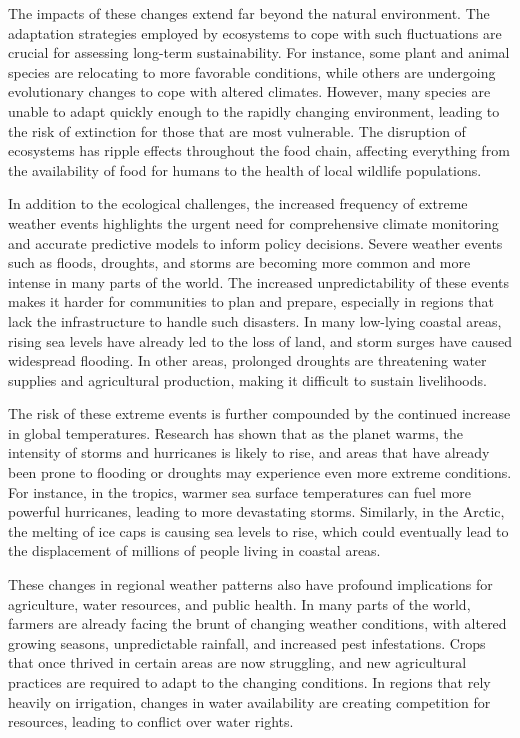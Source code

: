 The impacts of these changes extend far beyond the natural environment. The adaptation strategies employed by ecosystems to cope with such fluctuations are crucial for assessing long-term sustainability. For instance, some plant and animal species are relocating to more favorable conditions, while others are undergoing evolutionary changes to cope with altered climates. However, many species are unable to adapt quickly enough to the rapidly changing environment, leading to the risk of extinction for those that are most vulnerable. The disruption of ecosystems has ripple effects throughout the food chain, affecting everything from the availability of food for humans to the health of local wildlife populations.

In addition to the ecological challenges, the increased frequency of extreme weather events highlights the urgent need for comprehensive climate monitoring and accurate predictive models to inform policy decisions. Severe weather events such as floods, droughts, and storms are becoming more common and more intense in many parts of the world. The increased unpredictability of these events makes it harder for communities to plan and prepare, especially in regions that lack the infrastructure to handle such disasters. In many low-lying coastal areas, rising sea levels have already led to the loss of land, and storm surges have caused widespread flooding. In other areas, prolonged droughts are threatening water supplies and agricultural production, making it difficult to sustain livelihoods.

The risk of these extreme events is further compounded by the continued increase in global temperatures. Research has shown that as the planet warms, the intensity of storms and hurricanes is likely to rise, and areas that have already been prone to flooding or droughts may experience even more extreme conditions. For instance, in the tropics, warmer sea surface temperatures can fuel more powerful hurricanes, leading to more devastating storms. Similarly, in the Arctic, the melting of ice caps is causing sea levels to rise, which could eventually lead to the displacement of millions of people living in coastal areas.

These changes in regional weather patterns also have profound implications for agriculture, water resources, and public health. In many parts of the world, farmers are already facing the brunt of changing weather conditions, with altered growing seasons, unpredictable rainfall, and increased pest infestations. Crops that once thrived in certain areas are now struggling, and new agricultural practices are required to adapt to the changing conditions. In regions that rely heavily on irrigation, changes in water availability are creating competition for resources, leading to conflict over water rights.


